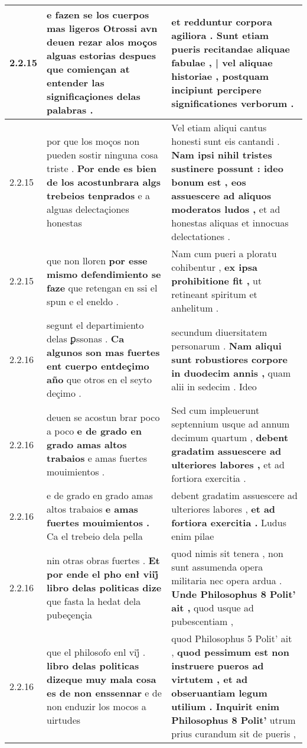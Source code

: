 \begin{tabular}{|p{1cm}|p{6.5cm}|p{6.5cm}|}
2.2.15 & e fazen se los cuerpos mas ligeros \textbf{ Otrossi avn deuen rezar alos moços alguas estorias } despues que comiençan at entender las significaçiones delas palabras . & et redduntur corpora agiliora . Sunt \textbf{ etiam pueris recitandae aliquae fabulae , | vel aliquae historiae , } postquam incipiunt percipere significationes verborum . \\\hline
2.2.15 & por que los moços non pueden sostir ninguna cosa triste . \textbf{ Por ende es bien de los acostunbrara algs trebeios tenprados } e a alguas delectaçiones honestas & Vel etiam aliqui cantus honesti sunt eis cantandi . \textbf{ Nam ipsi nihil tristes sustinere possunt : ideo bonum est , eos assuescere ad aliquos moderatos ludos , } et ad honestas aliquas et innocuas delectationes . \\\hline
2.2.15 & que non lloren \textbf{ por esse mismo defendimiento se faze } que retengan en ssi el spun e el eneldo . & Nam cum pueri a ploratu cohibentur , \textbf{ ex ipsa prohibitione fit , } ut retineant spiritum et anhelitum . \\\hline
2.2.16 & segunt el departimiento delas ꝑssonas . \textbf{ Ca algunos son mas fuertes ent cuerpo entdeçimo año } que otros en el seyto deçimo . & secundum diuersitatem personarum . \textbf{ Nam aliqui sunt robustiores corpore in duodecim annis , } quam alii in sedecim . Ideo \\\hline
2.2.16 & deuen se acostun brar poco a poco \textbf{ e de grado en grado amas altos trabaios } e amas fuertes mouimientos . & Sed cum impleuerunt septennium usque ad annum decimum quartum , \textbf{ debent gradatim assuescere ad ulteriores labores , } et ad fortiora exercitia . \\\hline
2.2.16 & e de grado en grado amas altos trabaios \textbf{ e amas fuertes mouimientos . } Ca el trebeio dela pella & debent gradatim assuescere ad ulteriores labores , \textbf{ et ad fortiora exercitia . } Ludus enim pilae \\\hline
2.2.16 & nin otras obras fuertes . \textbf{ Et por ende el pho enł viij̊ libro delas politicas dize } que fasta la hedat dela pubeçençia & quod nimis sit tenera , non sunt assumenda opera militaria nec opera ardua . \textbf{ Unde Philosophus 8 Polit’ ait , } quod usque ad pubescentiam , \\\hline
2.2.16 & que el philosofo enl vij̊ . \textbf{ libro delas politicas dizeque muy mala cosa es de non enssennar } e de non enduzir los mocos a uirtudes & quod Philosophus 5 Polit’ ait , \textbf{ quod pessimum est non instruere pueros ad virtutem , et ad obseruantiam legum utilium . Inquirit enim Philosophus 8 Polit’ } utrum prius curandum sit de pueris , \\\hline

\end{tabular}
